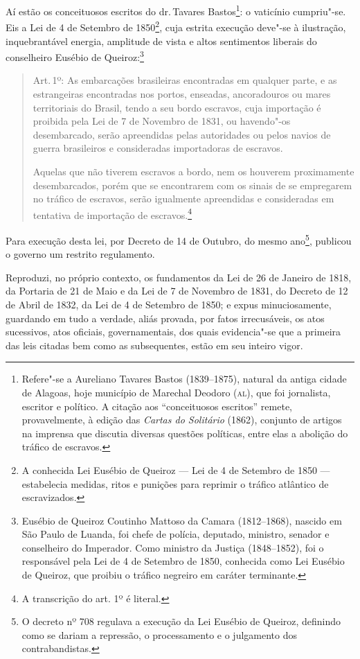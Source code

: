 Aí estão os conceituosos escritos do dr.\,Tavares Bastos\footnote{
  Refere"-se a Aureliano Tavares Bastos (1839--1875), natural da antiga
  cidade de Alagoas, hoje município de Marechal Deodoro (\textsc{al}), que foi
  jornalista, escritor e político. A citação aos ``conceituosos escritos''
  remete, provavelmente, à edição das \emph{Cartas do Solitário} (1862),
  conjunto de artigos na imprensa que discutia diversas questões
  políticas, entre elas a abolição do tráfico de escravos.}: o vaticínio
cumpriu"-se. Eis a Lei de 4 de Setembro de 1850\footnote{A conhecida
  Lei Eusébio de Queiroz --- Lei de 4 de Setembro de 1850 --- estabelecia
  medidas, ritos e punições para reprimir o tráfico atlântico de
  escravizados.}, cuja estrita execução deve"-se à ilustração,
inquebrantável energia, amplitude de vista e altos sentimentos liberais
do conselheiro Eusébio de Queiroz:\footnote{Eusébio de Queiroz
  Coutinho Mattoso da Camara (1812--1868), nascido em São Paulo de
  Luanda, foi chefe de polícia, deputado, ministro, senador e
  conselheiro do Imperador. Como ministro da Justiça (1848--1852), foi o
  responsável pela Lei de 4 de Setembro de 1850, conhecida como Lei
  Eusébio de Queiroz, que proibiu o tráfico negreiro em caráter
  terminante.}

\begin{quote}
Art.\,1º: As embarcações brasileiras encontradas em qualquer parte, e as
estrangeiras encontradas nos portos, enseadas, ancoradouros ou mares
territoriais do Brasil, tendo a seu bordo escravos, cuja importação é
proibida pela Lei de 7 de Novembro de 1831, ou havendo"-os desembarcado,
serão apreendidas pelas autoridades ou pelos navios de guerra
brasileiros e consideradas importadoras de escravos.

Aquelas que não tiverem escravos a bordo, nem os houverem proximamente
desembarcados, porém que se encontrarem com os sinais de se empregarem
no tráfico de escravos, serão igualmente apreendidas e consideradas em
tentativa de importação de escravos.\footnote{A transcrição do art.
  1º é literal.}
\end{quote}  

Para execução desta lei, por Decreto de 14 de Outubro, do mesmo
ano\footnote{O decreto nº 708 regulava a execução da Lei Eusébio de
  Queiroz, definindo como se dariam a repressão, o processamento e o
  julgamento dos contrabandistas.}, publicou o governo um restrito
regulamento.

\asterisc

Reproduzi, no próprio contexto, os fundamentos da Lei de 26 de Janeiro
de 1818, da Portaria de 21 de Maio e da Lei de 7 de Novembro de 1831, do
Decreto de 12 de Abril de 1832, da Lei de 4 de Setembro de 1850; e expus
minuciosamente, guardando em tudo a verdade, aliás provada, por fatos
irrecusáveis, os atos sucessivos, atos oficiais, governamentais, dos
quais evidencia"-se que a primeira das leis citadas bem como as
subsequentes, estão em seu inteiro vigor.

